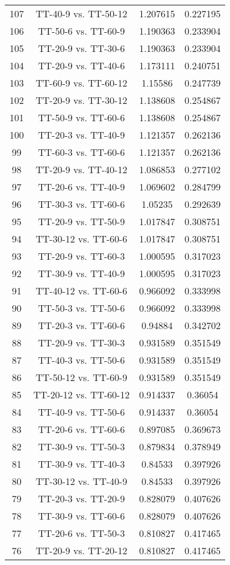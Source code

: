 \documentclass[a4paper,10pt]{article}
\begin{document}
\begin{landscape}
\begin{table}[!htp]
\begin{tabular}{cccc}
107&TT-40-9 vs. TT-50-12&1.207615&0.227195\\
106&TT-50-6 vs. TT-60-9&1.190363&0.233904\\
105&TT-20-9 vs. TT-30-6&1.190363&0.233904\\
104&TT-20-9 vs. TT-40-6&1.173111&0.240751\\
103&TT-60-9 vs. TT-60-12&1.15586&0.247739\\
102&TT-20-9 vs. TT-30-12&1.138608&0.254867\\
101&TT-50-9 vs. TT-60-6&1.138608&0.254867\\
100&TT-20-3 vs. TT-40-9&1.121357&0.262136\\
99&TT-60-3 vs. TT-60-6&1.121357&0.262136\\
98&TT-20-9 vs. TT-40-12&1.086853&0.277102\\
97&TT-20-6 vs. TT-40-9&1.069602&0.284799\\
96&TT-30-3 vs. TT-60-6&1.05235&0.292639\\
95&TT-20-9 vs. TT-50-9&1.017847&0.308751\\
94&TT-30-12 vs. TT-60-6&1.017847&0.308751\\
93&TT-20-9 vs. TT-60-3&1.000595&0.317023\\
92&TT-30-9 vs. TT-40-9&1.000595&0.317023\\
91&TT-40-12 vs. TT-60-6&0.966092&0.333998\\
90&TT-50-3 vs. TT-50-6&0.966092&0.333998\\
89&TT-20-3 vs. TT-60-6&0.94884&0.342702\\
88&TT-20-9 vs. TT-30-3&0.931589&0.351549\\
87&TT-40-3 vs. TT-50-6&0.931589&0.351549\\
86&TT-50-12 vs. TT-60-9&0.931589&0.351549\\
85&TT-20-12 vs. TT-60-12&0.914337&0.36054\\
84&TT-40-9 vs. TT-50-6&0.914337&0.36054\\
83&TT-20-6 vs. TT-60-6&0.897085&0.369673\\
82&TT-30-9 vs. TT-50-3&0.879834&0.378949\\
81&TT-30-9 vs. TT-40-3&0.84533&0.397926\\
80&TT-30-12 vs. TT-40-9&0.84533&0.397926\\
79&TT-20-3 vs. TT-20-9&0.828079&0.407626\\
78&TT-30-9 vs. TT-60-6&0.828079&0.407626\\
77&TT-20-6 vs. TT-50-3&0.810827&0.417465\\
76&TT-20-9 vs. TT-20-12&0.810827&0.417465\\

\end{tabular}
\end{table}
\end{landscape}
\end{document}
